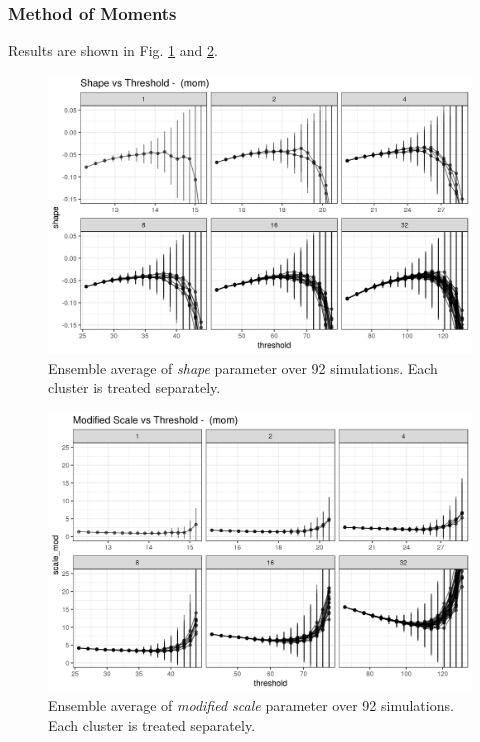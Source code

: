 \documentclass{article}
\begin{document}
\subsubsection{Method of Moments}
Results are shown in Fig. \ref{fig:shape_mom} and \ref{fig:modscale_mom}.

\begin{figure}
	\includegraphics[width=\linewidth]{fig/shape_mom_RK401_1e7_maxt05_1e7.png}
	\caption{Ensemble average of \textit{shape} parameter over 92 simulations. Each cluster is treated separately.}
	\label{fig:shape_mom}
\end{figure}

\begin{figure}
	\includegraphics[width=\linewidth]{fig/modscale_mom_RK401_1e7_maxt05_1e7.png}
	\caption{Ensemble average of \textit{modified scale} parameter over 92 simulations. Each cluster is treated separately.}
	\label{fig:modscale_mom}
\end{figure}
\end{document}
